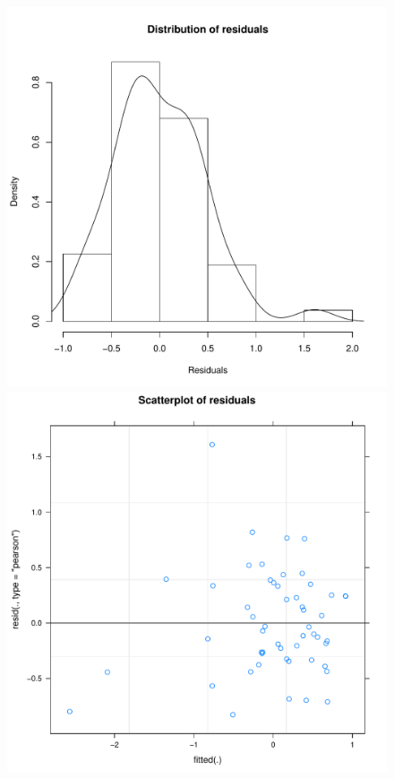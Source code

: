 \begin{CJK}{UTF8}{gbsn}
\begin{figure}[htbp]
    \includegraphics[scale =.4]{images/TEM2TeamHist.pdf}
    \includegraphics[scale =.4]{images/TEM2TeamScatter.pdf}

\end{figure}
\end{CJK}
